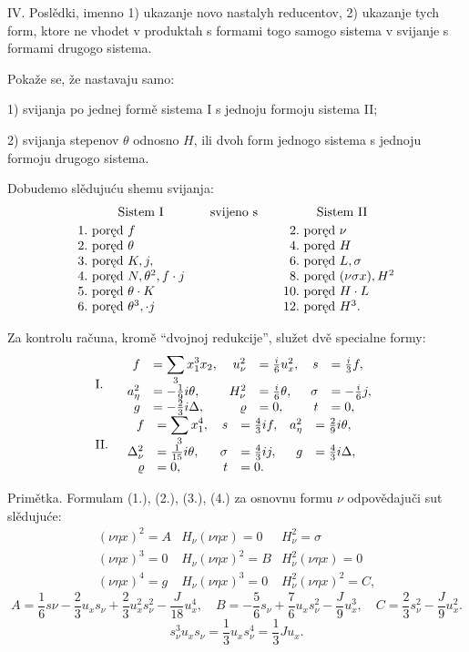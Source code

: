 \documentclass[11pt]{article}
\let\A\relax
\newcommand{\A}{\mathfrak A}
\begin{document}
IV. Poslědki, imenno 1) ukazanje novo nastalyh reducentov, 2) ukazanje tych form, ktore ne vhodet v produktah s formami togo samogo sistema v svijanje s formami drugogo sistema.

Pokaže se, že nastavaju samo:

1) svijanja po jednej formě sistema I s jednoju formoju sistema II;

2) svijanja stepenov $\theta$ odnosno $H$, ili dvoh form jednogo sistema s jednoju formoju drugogo sistema.

Dobudemo slědujuću shemu svijanja:
\[
\begin{array}{r@{\ }c@{\ }l@{\qquad}c@{\qquad}r@{\ }c@{\ }l}
\multicolumn{3}{c}{\text{Sistem I}} & \text{svijeno s} & \multicolumn{3}{c}{\text{Sistem II}}\\[0.25em]
1. & \text{poręd} & f & & 2. & \text{poręd} & \nu\\
2. & \text{poręd} & \theta & & 4. & \text{poręd} & H\\
3. & \text{poręd} & K,j,\A & & 6. & \text{poręd} & L,\sigma\\
4. & \text{poręd} & N,\theta^2,f\cdot j & & 8. & \text{poręd} & (\nu\sigma x),H^2\\
5. & \text{poręd} & \theta\cdot K & & 10. & \text{poręd} & H\cdot L\\
6. & \text{poręd} & \theta^3,\A\cdot j & & 12. & \text{poręd} & H^3.
\end{array}
\]

Za kontrolu računa, kromě ``dvojnoj redukcije'', služet dvě specialne formy:
\[
\begin{array}{ll}
\text{I.}&\begin{array}{rlrlrl}
f&=\displaystyle\sum_3x_1^3x_2,& u_\nu^2&=\frac{i}{6}u_x^2,& s&=\frac{i}{3}f,\\
a_\eta^2&=-\frac19 i\theta,& H_\nu^2&=\frac{i}{6}\theta,& \sigma&=-\frac{i}{6}j,\\
g&=-\frac23i\Delta,& \varrho&=0,& t&=0,
\end{array}\\[1.2\baselineskip]
\text{II.}&\begin{array}{rlrlrl}
f&=\displaystyle\sum_3x_1^4,& s&=\frac43if,& a_\eta^2&=\frac29i\theta,\\
\Delta_\nu^2&=\frac1{15}i\theta,& \sigma&=\frac43ij,& g&=\frac43i\Delta,\\
\varrho&=0,& t&=0.
\end{array}
\end{array}
\]

Primětka. Formulam (1.), (2.), (3.), (4.) za osnovnu formu $\nu$ odpovědajuči sut slědujuće:
\[
\tag{5}
\begin{array}{c|c|c}
(\nu\eta x)^2=A & H_\nu(\nu\eta x)=0 & H_\nu^2=\sigma\\[0.4em]
(\nu\eta x)^3=0 & H_\nu(\nu\eta x)^2=B & H_\nu^2(\nu\eta x)=0\\[0.4em]
(\nu\eta x)^4=g & H_\nu(\nu\eta x)^3=0 & H_\nu^2(\nu\eta x)^2=C,
\end{array}
\]
\[
A=\frac16s\nu-\frac23u_xs_\nu+\frac23u_x^2s_\nu^2-\frac{J}{18}u_x^4,
\quad B=-\frac56s_\nu+\frac76u_xs_\nu^2-\frac{J}{9}u_x^3,
\quad C=\frac23s_\nu^2-\frac{J}{9}u_x^2.
\]
\[
\tag{6}
s_\nu^3u_xs_\nu=\frac13u_xs_\nu^4=\frac13Ju_x.
\]
\end{document}
